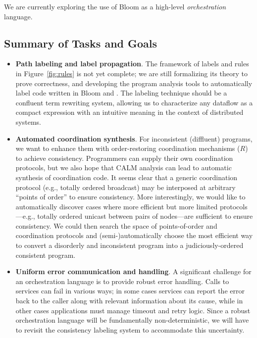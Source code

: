We are currently exploring the use of Bloom as a high-level \emph{orchestration} language.  

\subsection{Summary of Tasks and Goals}
\begin{itemize}
\item \textbf{Path labeling and label propagation}.
The framework of labels and rules in Figure~\ref{fig:rules} is not yet complete; we are still formalizing its theory to prove correctness, and developing the program analysis tools to automatically label code written in Bloom and \blooml.  The labeling technique should be a confluent term rewriting system, allowing us to 
characterize any dataflow as a compact expression with an intuitive 
meaning in the context of distributed systems.

\item \textbf{Automated coordination synthesis}.
For inconsistent (diffluent) programs, we want to enhance them with order-restoring coordination mechanisms ($R$) to achieve consistency.
Programmers can supply their own coordination protocols, but we also hope that CALM analysis can lead to automatic synthesis of coordination code. 
It seems clear that a generic coordination 
protocol (e.g., totally ordered broadcast) may be interposed at arbitrary 
``points of order''
to ensure consistency.  More interestingly, we would like to automatically
discover cases where more efficient but more limited protocols---e.g., totally ordered unicast between pairs of nodes---are sufficient to ensure consistency.  We could then search the space of points-of-order and coordination protocols and (semi-)automatically choose the most efficient way to convert a disorderly and inconsistent program into a judiciously-ordered consistent program.

\item \textbf{Uniform error communication and handling}.
A significant challenge for an orchestration language is to provide robust error handling.
Calls to services can fail in various ways; in some cases services can report the error
back to the caller along with relevant information about its cause, while in other cases
applications must manage timeout and retry logic.  Since a robust orchestration language will
be fundamentally non-deterministic, we will have to revisit the consistency labeling system to
accommodate this uncertainty.


\end{itemize}
